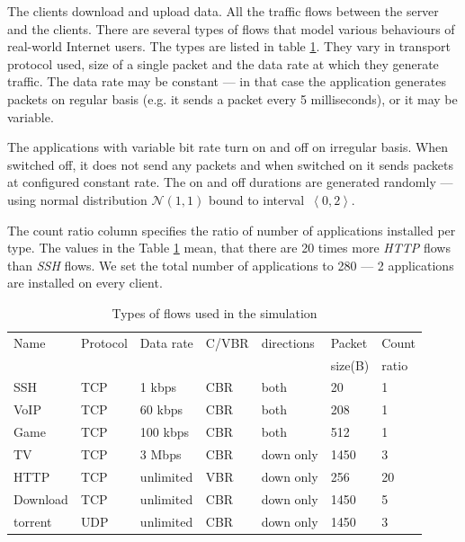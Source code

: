 The clients download and upload data. All the traffic flows between the server and the clients. There are several types of flows that model various behaviours of real-world Internet users. The types are listed in table \ref{tab:traffic}. They vary in transport protocol used, size of a single packet and the data rate at which they generate traffic. The data rate may be constant --- in that case the application generates packets on regular basis (e.g. it sends a packet every 5 milliseconds), or it may be variable.

The applications with variable bit rate turn on and off on irregular basis. When switched off, it does not send any packets and when switched on it sends packets at configured constant rate. The on and off durations are generated randomly --- using normal distribution $\mathcal{N}(1,1)$ bound to interval~$\left\langle0,2\right\rangle$.

The count ratio column specifies the ratio of number of applications installed per type. The values in the Table \ref{tab:traffic} mean, that there are 20 times more \emph{HTTP} flows than \emph{SSH} flows. We set the total number of applications to 280 --- 2 applications are installed on every client. 

\begin{table}
	\centering
	
	\begin{tabular}{@{}lllllll@{}}
		\toprule
		Name     & Protocol & Data rate & C/VBR & directions & Packet  & Count \\
		         &          &           &       &            & size(B) & ratio \\ \midrule
		SSH      & TCP      & 1 kbps    & CBR   & both       & 20      & 1     \\
		VoIP     & TCP      & 60 kbps   & CBR   & both       & 208     & 1     \\
		Game     & TCP      & 100 kbps  & CBR   & both       & 512     & 1     \\
		TV       & TCP      & 3 Mbps    & CBR   & down only  & 1450    & 3     \\
		HTTP     & TCP      & unlimited & VBR   & down only  & 256     & 20    \\
		Download & TCP      & unlimited & CBR   & down only  & 1450    & 5     \\
		torrent  & UDP      & unlimited & CBR   & down only  & 1450    & 3     \\ \bottomrule
	\end{tabular}
	\caption{Types of flows used in the simulation}
	\label{tab:traffic}
\end{table}

